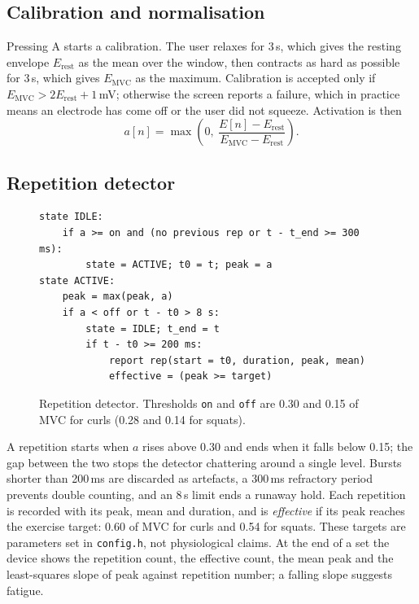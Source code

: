 \documentclass[11pt,letterpaper]{article}
\begin{document}
\subsection{Calibration and normalisation}
Pressing A starts a calibration. The user relaxes for 3\,s, which gives the resting envelope $E_{\mathrm{rest}}$ as the mean over the window, then contracts as hard as possible for 3\,s, which gives $E_{\mathrm{MVC}}$ as the maximum. Calibration is accepted only if $E_{\mathrm{MVC}} > 2E_{\mathrm{rest}} + 1$\,mV; otherwise the screen reports a failure, which in practice means an electrode has come off or the user did not squeeze. Activation is then
\begin{equation}
a[n]=\max\!\left(0,\ \frac{E[n]-E_{\mathrm{rest}}}{E_{\mathrm{MVC}}-E_{\mathrm{rest}}}\right).
\end{equation}

\subsection{Repetition detector}
\begin{figure}[t]
\begin{lstlisting}
state IDLE:
    if a >= on and (no previous rep or t - t_end >= 300 ms):
        state = ACTIVE; t0 = t; peak = a
state ACTIVE:
    peak = max(peak, a)
    if a < off or t - t0 > 8 s:
        state = IDLE; t_end = t
        if t - t0 >= 200 ms:
            report rep(start = t0, duration, peak, mean)
            effective = (peak >= target)
\end{lstlisting}
\caption{Repetition detector. Thresholds \texttt{on} and \texttt{off} are 0.30 and 0.15 of MVC for curls (0.28 and 0.14 for squats).}\label{fig:det}
\end{figure}
A repetition starts when $a$ rises above 0.30 and ends when it falls below 0.15; the gap between the two stops the detector chattering around a single level. Bursts shorter than 200\,ms are discarded as artefacts, a 300\,ms refractory period prevents double counting, and an 8\,s limit ends a runaway hold. Each repetition is recorded with its peak, mean and duration, and is \emph{effective} if its peak reaches the exercise target: 0.60 of MVC for curls and 0.54 for squats. These targets are parameters set in \texttt{config.h}, not physiological claims. At the end of a set the device shows the repetition count, the effective count, the mean peak and the least-squares slope of peak against repetition number; a falling slope suggests fatigue.
\end{document}
